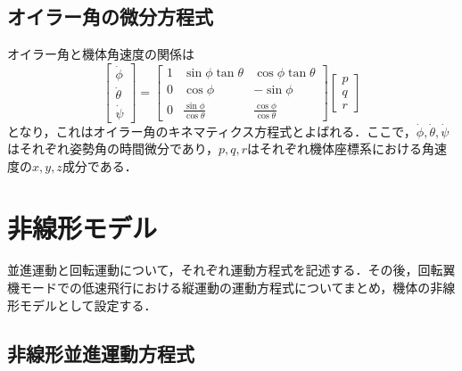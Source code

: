 \subsection{オイラー角の微分方程式}

オイラー角と機体角速度の関係は
\begin{equation}
  \left[
  \begin{array}{ccc}
    \dot{\phi} \\
    \dot{\theta} \\
    \dot{\psi}
  \end{array}
  \right]
   =
  \left[
  \begin{array}{ccc}
    1 & \sin\phi\tan\theta & \cos\phi\tan\theta \\
    0 & \cos\phi & -\sin\phi \\
    0 & \frac{\sin\phi}{\cos\theta} & \frac{\cos\phi}{\cos\theta}
  \end{array}
  \right]
  \left[
  \begin{array}{ccc}
    p \\
    q \\
    r
  \end{array}
  \right]
  \label{eq:euler}
\end{equation}
となり，これはオイラー角のキネマティクス方程式とよばれる．ここで，$\dot{\phi},\dot{\theta},\dot{\psi}$はそれぞれ姿勢角の時間微分であり，$p,q,r$はそれぞれ機体座標系における角速度の$x,y,z$成分である．

\section{非線形モデル}
\label{sec:nonlin_model}

並進運動と回転運動について，それぞれ運動方程式を記述する．その後，回転翼機モードでの低速飛行における縦運動の運動方程式についてまとめ，機体の非線形モデルとして設定する．

\subsection{非線形並進運動方程式}


